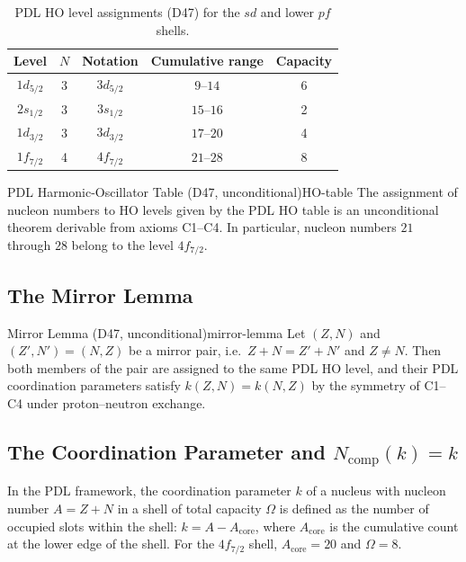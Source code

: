 \documentclass[12pt,a4paper]{article}
\theoremstyle{remark}
\begin{document}
\begin{table}[h]
\centering
\caption{PDL HO level assignments (D47) for the $sd$ and lower $pf$ shells.}
\label{tab:HO-levels}
\begin{tabular}{ccccc}
\toprule
Level & $N$ & Notation & Cumulative range & Capacity \\
\midrule
$1d_{5/2}$ & 3 & $3d_{5/2}$ & $9$--$14$ & 6 \\
$2s_{1/2}$ & 3 & $3s_{1/2}$ & $15$--$16$ & 2 \\
$1d_{3/2}$ & 3 & $3d_{3/2}$ & $17$--$20$ & 4 \\
$1f_{7/2}$ & 4 & $4f_{7/2}$ & $21$--$28$ & 8 \\
\bottomrule
\end{tabular}
\end{table}

\begin{pdltheorem}{PDL Harmonic-Oscillator Table (D47, unconditional)}{HO-table}
The assignment of nucleon numbers to HO levels given by the PDL HO table is an unconditional theorem derivable from axioms C1--C4. In particular, nucleon numbers $21$ through $28$ belong to the level $4f_{7/2}$.
\end{pdltheorem}

\subsection{The Mirror Lemma}
\label{ssec:mirror}

\begin{pdltheorem}{Mirror Lemma (D47, unconditional)}{mirror-lemma}
Let $(Z, N)$ and $(Z', N') = (N, Z)$ be a mirror pair, i.e.\ $Z + N = Z' + N'$ and $Z \neq N$. Then both members of the pair are assigned to the same PDL HO level, and their PDL coordination parameters satisfy $k(Z,N) = k(N,Z)$ by the symmetry of C1--C4 under proton--neutron exchange.
\end{pdltheorem}

\subsection{The Coordination Parameter and \texorpdfstring{$N_{\text{comp}}(k) = k$}{N\_comp(k) = k}}
\label{ssec:Ncomp}

In the PDL framework, the coordination parameter $k$ of a nucleus with nucleon number $A = Z + N$ in a shell of total capacity $\Omega$ is defined as the number of occupied slots within the shell: $k = A - A_{\text{core}}$, where $A_{\text{core}}$ is the cumulative count at the lower edge of the shell. For the $4f_{7/2}$ shell, $A_{\text{core}} = 20$ and $\Omega = 8$.
\end{document}
